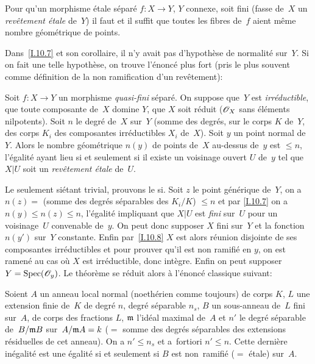 \begin{corollaire}
\label{I.10.10}
Pour qu'un morphisme \'etale s\'epar\'e $f\colon X\to Y$, $Y$
connexe, soit fini (\ie fasse de~$X$ un \emph{revêtement
étale} de~$Y$) il faut et il suffit que toutes les fibres de~$f$
aient m\^eme nombre g\'eom\'etrique de points.
\end{corollaire}

Dans~\ref{I.10.7}
et son corollaire, il n'y avait pas d'hypoth\`ese de normalit\'e
sur~$Y$. Si on fait une telle hypoth\`ese, on trouve
l'\'enonc\'e plus fort (pris le plus souvent comme
d\'efinition de la non ramification d'un rev\^etement):

\begin{theoreme}
\label{I.10.11}
Soit
$f\colon X\to Y$ un morphisme \emph{quasi-fini} s\'epar\'e.
On suppose que~$Y$ est \emph{irréductible}, que toute composante
de~$X$ domine $Y$, que $X$ soit r\'eduit (\ie $\cal{O}_X$ sans
\'el\'ements nilpotents). Soit $n$ le degr\'e de~$X$ sur~$Y$
(somme des degr\'es, sur le corps $K$ de~$Y$, des corps $K_i$ des
composantes irr\'eductibles $X_i$ de~$X$). Soit $y$ un point normal
de~$Y$. Alors le nombre g\'eom\'etrique $n(y)$ de points de~$X$
au-dessus de~$y$ est $\le n$, l'\'egalit\'e ayant lieu si et
seulement si il existe un voisinage ouvert $U$ de~$y$ tel que $X|U$
soit un \emph{revêtement étale} de~$U$.
\end{theoreme}

Le \og seulement si\fg \'etant trivial, prouvons le \og si\fg. Soit $z$ le
point g\'en\'erique de~$Y$, on a $n(z)=$ (somme des degr\'es
s\'eparables des $K_i/K$) $\le n$ et par \ref{I.10.7} on a $n(y)\le n(z)\le
n$, l'\'egalit\'e impliquant que $X|U$ est \emph{fini} sur~$U$
pour un voisinage~$U$ convenable de~$y$. On peut donc supposer $X$
fini sur~$Y$ et la fonction $n(y')$ sur~$Y$ constante. Enfin par~\ref{I.10.8}
$X$ est alors r\'eunion disjointe de ses composantes
irr\'eductibles et pour prouver qu'il est non ramifi\'e en $y$, on
est ramen\'e au cas o\`u $X$ est irr\'eductible, donc
int\`egre. Enfin on peut supposer $Y=\Spec(\cal{O}_y)$. Le
th\'eor\`eme se r\'eduit alors \`a l'\'enonc\'e classique
suivant:

\begin{corollaire}
\label{I.10.12}
Soient $A$ un anneau local normal (noeth\'erien comme toujours) de
corps $K$, $L$ une extension finie de~$K$ de degr\'e $n$, degr\'e
s\'eparable $n_s$, $B$ un sous-anneau de~$L$ fini sur~$A$, de corps
des fractions
$L$,
$\mathfrak{m}$ l'id\'eal maximal de~$A$ et $n'$ le
degr\'e s\'eparable de~$B/\mathfrak{m}B$ sur~$A/\mathfrak{m}A=k$ ($=$
somme des degr\'es s\'eparables des extensions r\'esiduelles de
cet anneau). On a $n'\le n_s$ et a~fortiori $n'\le n$. Cette
derni\`ere in\'egalit\'e est une \'egalit\'e si et seulement
si $B$ est non~ramifi\'e ($=$ \'etale) sur~$A$.
\end{corollaire}


